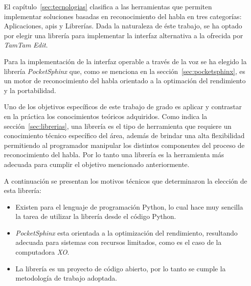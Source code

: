 El cap\'itulo~\ref{sec:tecnologias} clasifica a las herramientas que permiten implementar soluciones
basadas en reconocimiento del habla en tres categor\'ias: Aplicaciones, \gls{api}s y Librer\'ias. Dada la naturaleza de \'este trabajo, se
ha optado por elegir una librer\'ia para implementar la interfaz alternativa a la ofrecida por
\emph{TamTam Edit}.

Para la implementaci\'on de la interfaz operable a trav\'es de la voz se ha elegido la librer\'ia \emph{PocketSphinx} que,
como se menciona en la secci\'on~\ref{sec:pocketsphinx}, es un motor de reconocimiento del habla orientado a la optimaci\'on
del rendimiento y la portabilidad.

Uno de los objetivos espec\'ificos de este trabajo de grado es aplicar y contrastar en la pr\'actica
los conocimientos te\'oricos adquiridos. Como indica la secci\'on~\ref{sec:librerias}, una librer\'ia es
el tipo de herramienta que requiere un conocimiento t\'ecnico espec\'ifico del \'area, adem\'as de
brindar una alta flexibilidad permitiendo al programador manipular los distintos componentes del
proceso de reconocimiento del habla. Por lo tanto una librer\'ia es la herramienta m\'as adecuada
para cumplir el objetivo mencionado anteriormente.

A continuaci\'on se presentan los motivos t\'ecnicos que determinaron la elecci\'on de esta librer\'ia:

\begin{itemize}
    \item Existen  para el lenguaje de programaci\'on Python, lo cual hace muy sencilla la tarea de utilizar
	la librer\'ia desde el c\'odigo Python.
    \item \emph{PocketSphinx} esta orientada a la optimizaci\'on del rendimiento, resultando adecuada para sistemas con
	recursos limitados, como es el caso de la computadora \emph{XO}.
    \item La librer\'ia es un proyecto de c\'odigo abierto, por lo tanto se cumple la metodolog\'ia de trabajo adoptada.
\end{itemize}
